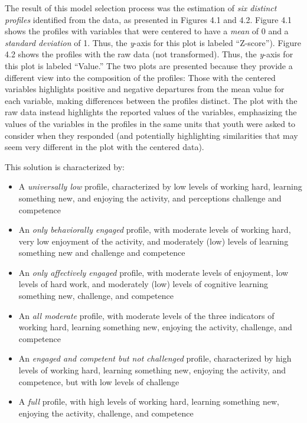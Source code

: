 \documentclass[]{msu-thesis}
\providecommand{\tightlist}{%
  \setlength{\itemsep}{0pt}\setlength{\parskip}{0pt}}
\theoremstyle{definition}
\theoremstyle{definition}
\theoremstyle{definition}
\theoremstyle{remark}
\begin{document}
The result of this model selection process was the estimation of
\emph{six distinct profiles} identified from the data, as presented in
Figures 4.1 and 4.2. Figure 4.1 shows the profiles with variables that
were centered to have a \emph{mean} of 0 and a \emph{standard deviation}
of 1. Thus, the \emph{y}-axis for this plot is labeled ``Z-score'').
Figure 4.2 shows the profiles with the raw data (not transformed). Thus,
the \emph{y}-axis for this plot is labeled ``Value.'' The two plots are
presented because they provide a different view into the composition of
the profiles: Those with the centered variables highlights positive and
negative departures from the mean value for each variable, making
differences between the profiles distinct. The plot with the raw data
instead highlights the reported values of the variables, emphasizing the
values of the variables in the profiles in the same units that youth
were asked to consider when they responded (and potentially highlighting
similarities that may seem very different in the plot with the centered
data).

This solution is characterized by:

\begin{itemize}
\tightlist
\item
  A \emph{universally low} profile, characterized by low levels of
  working hard, learning something new, and enjoying the activity, and
  perceptions challenge and competence
\item
  An \emph{only behaviorally engaged} profile, with moderate levels of
  working hard, very low enjoyment of the activity, and moderately (low)
  levels of learning something new and challenge and competence
\item
  An \emph{only affectively engaged} profile, with moderate levels of
  enjoyment, low levels of hard work, and moderately (low) levels of
  cognitive learning something new, challenge, and competence
\item
  An \emph{all moderate} profile, with moderate levels of the three
  indicators of working hard, learning something new, enjoying the
  activity, challenge, and competence
\item
  An \emph{engaged and competent but not challenged} profile,
  characterized by high levels of working hard, learning something new,
  enjoying the activity, and competence, but with low levels of
  challenge
\item
  A \emph{full} profile, with high levels of working hard, learning
  something new, enjoying the activity, challenge, and competence
\end{itemize}
\end{document}
